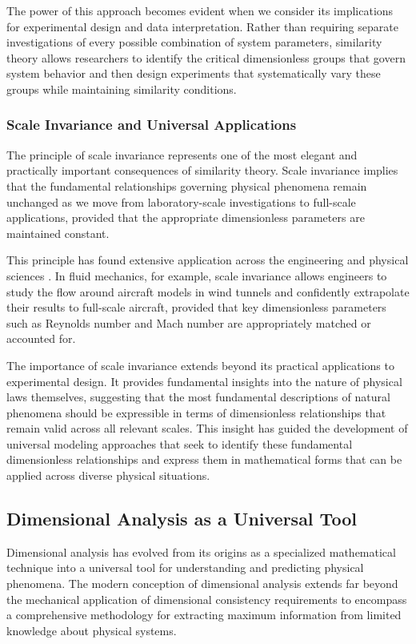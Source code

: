 \documentclass[
	11pt, %
	fleqn, %
	a4paper, %
]{LegrandOrangeBook}
\begin{document}
The power of this approach becomes evident when we consider its implications for experimental design and data interpretation. Rather than requiring separate investigations of every possible combination of system parameters, similarity theory allows researchers to identify the critical dimensionless groups that govern system behavior and then design experiments that systematically vary these groups while maintaining similarity conditions.

\subsubsection{Scale Invariance and Universal Applications}

The principle of scale invariance represents one of the most elegant and practically important consequences of similarity theory. Scale invariance implies that the fundamental relationships governing physical phenomena remain unchanged as we move from laboratory-scale investigations to full-scale applications, provided that the appropriate dimensionless parameters are maintained constant.

This principle has found extensive application across the engineering and physical sciences \cite{zierep1991}. In fluid mechanics, for example, scale invariance allows engineers to study the flow around aircraft models in wind tunnels and confidently extrapolate their results to full-scale aircraft, provided that key dimensionless parameters such as Reynolds number and Mach number are appropriately matched or accounted for.

The importance of scale invariance extends beyond its practical applications to experimental design. It provides fundamental insights into the nature of physical laws themselves, suggesting that the most fundamental descriptions of natural phenomena should be expressible in terms of dimensionless relationships that remain valid across all relevant scales. This insight has guided the development of universal modeling approaches that seek to identify these fundamental dimensionless relationships and express them in mathematical forms that can be applied across diverse physical situations.

\subsection{Dimensional Analysis as a Universal Tool}

Dimensional analysis has evolved from its origins as a specialized mathematical technique into a universal tool for understanding and predicting physical phenomena. The modern conception of dimensional analysis extends far beyond the mechanical application of dimensional consistency requirements to encompass a comprehensive methodology for extracting maximum information from limited knowledge about physical systems.
\end{document}
